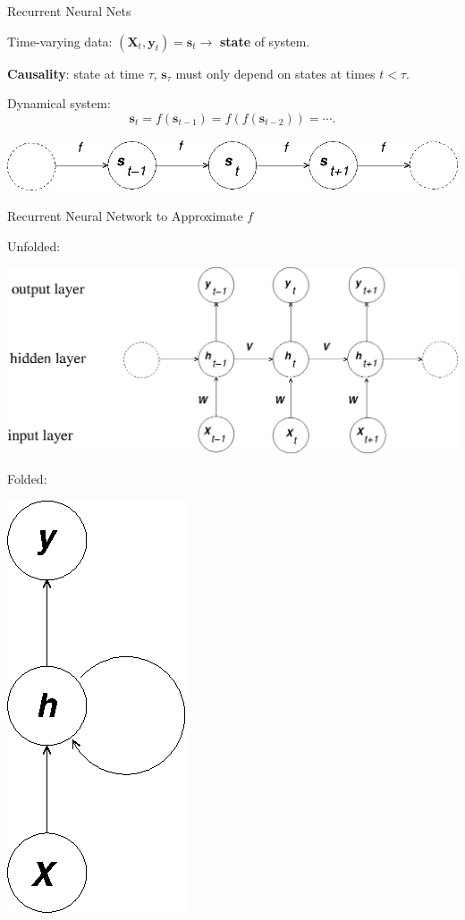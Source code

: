 \documentclass[12pt,t]{beamer}
\begin{document}
\begin{frame}{Recurrent Neural Nets}

Time-varying data: $ (\mathbf{X}_t, \mathbf{y}_t)  = \mathbf{s}_t \longrightarrow$ {\bf state} of system.

\bigskip

{\bf Causality}: state at time $\tau$, $\mathbf{s}_\tau$ must only depend on states at times $t<\tau$.

\bigskip

Dynamical system:
$$  \mathbf{s}_t = f( \mathbf{s}_{t-1}) = f(f( \mathbf{s}_{t-2})) = \cdots.$$

 \centerline{
\includegraphics[height=0.1\textheight]{./images/dynsys.png} 
}

\end{frame}

\begin{frame}{ Recurrent Neural Network to Approximate $f$}

\bigskip
Unfolded:
 \centerline{
\includegraphics[height=0.45\textheight]{./images/unfolded-rnn.png} 
}

\bigskip
Folded:
 \centerline{
\includegraphics[height=0.25\textheight]{./images/folded-rnn.png} 
}

\end{frame}
\end{document}
